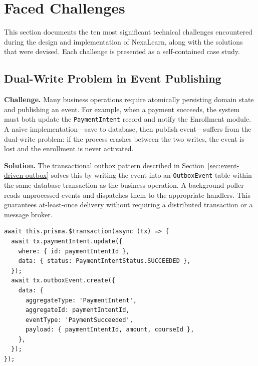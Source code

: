 
\section{Faced Challenges}
\label{sec:challenges}

This section documents the ten most significant technical challenges encountered during the design and implementation of NexaLearn, along with the solutions that were devised. Each challenge is presented as a self-contained case study.

\subsection{Dual-Write Problem in Event Publishing}

\textbf{Challenge.} Many business operations require atomically persisting domain state and publishing an event. For example, when a payment succeeds, the system must both update the \texttt{PaymentIntent} record and notify the Enrollment module. A naive implementation---save to database, then publish event---suffers from the dual-write problem: if the process crashes between the two writes, the event is lost and the enrollment is never activated.

\textbf{Solution.} The transactional outbox pattern described in Section~\ref{sec:event-driven-outbox} solves this by writing the event into an \texttt{OutboxEvent} table within the same database transaction as the business operation. A background poller reads unprocessed events and dispatches them to the appropriate handlers. This guarantees at-least-once delivery without requiring a distributed transaction or a message broker.

\begin{lstlisting}[caption=Outbox event written atomically with business data,label=lst:outbox-tx]
await this.prisma.$transaction(async (tx) => {
  await tx.paymentIntent.update({
    where: { id: paymentIntentId },
    data: { status: PaymentIntentStatus.SUCCEEDED },
  });
  await tx.outboxEvent.create({
    data: {
      aggregateType: 'PaymentIntent',
      aggregateId: paymentIntentId,
      eventType: 'PaymentSucceeded',
      payload: { paymentIntentId, amount, courseId },
    },
  });
});
\end{lstlisting}

